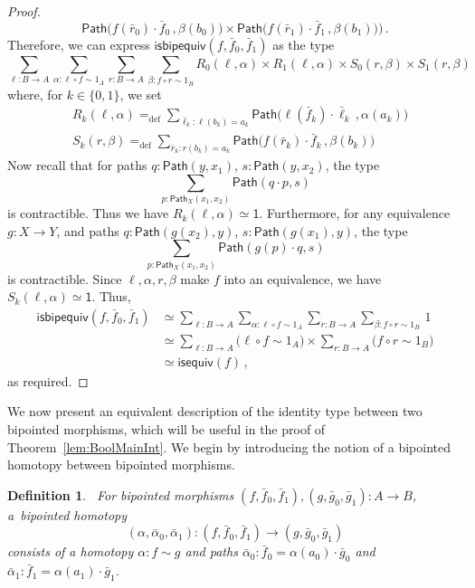 \documentclass[10pt,a4paper,oneside,reqno]{amsart}
\numberwithin{equation}{section}
\theoremstyle{mythm}
\theoremstyle{mydef}
\newtheorem{definition}[theorem]{Definition}
\theoremstyle{myrmk}
\newcommand{\defeq}{=_{\mathrm{def}}}
\newcommand{\co}{\colon}
\newcommand{\comp}{\circ}
\newcommand{\isequiv}{\mathsf{isequiv}}
\newcommand{\ct}{\cdot}
\newcommand{\Id}{\mathsf{Path}}
\newcommand{\one}{\mathsf{1}}
\newcommand{\isbipequiv}{\mathsf{isbipequiv}}
\begin{document}
\begin{proof}
\[\Id  \big( f (\bar{r}_0) \ct \bar{f}_0 \, ,  \beta(b_0) \big) 
\times 
\Id \big( f(\bar{r}_1) \ct \bar{f}_1 \, ,  \beta(b_1) \big)
\Big) \, .
\]
Therefore, we can express $\isbipequiv(f, \bar{f}_0, \bar{f}_1)$ as the type
\[
\sum_{\ell \co B \to  A} 
\sum_{\alpha : \ell \comp f \sim 1_A}
\sum_{ r \co B \to A} 
\sum_{\beta : f \comp r \sim 1_B} 
	R_0(\ell,\alpha) \times R_1(\ell,\alpha) \times S_0(r,\beta) \times S_1(r,\beta)
\]
where, for $k \in \{0,1\}$, we set
\begin{align*}
& R_k(\ell,\alpha) \defeq \sum_{\bar{\ell}_k : \ell(b_k)=a_k} \Id \big( \ell (\bar{f}_k) \ct \bar{\ell}_k \, ,  \alpha(a_k) \big) \\
& S_k(r,\beta) \defeq \sum_{\bar{r}_k : r(b_k)=a_k} \Id \big( f (\bar{r}_k) \ct \bar{f}_k \, ,  \beta(b_k) \big) 
\end{align*}
Now recall  that for paths $q : \Id(y,x_1)$, $s : \Id(y,x_2)$, the type 
\[
\sum_{p : \Id_X(x_1,x_2)} \Id(q \ct p,s)
\] 
is contractible. Thus we have $R_k(\ell,\alpha) \simeq \one$.
Furthermore, for any equivalence $g : X \to Y$, and paths $q : \Id(g(x_2),y)$, $s : \Id(g(x_1),y)$, the type 
\[
\sum_{p : \Id_X(x_1,x_2)} \Id(g(p) \ct q,s)
\] is contractible. Since $\ell, \alpha, r, \beta$ make $f$ into an equivalence, we have $S_k(\ell,\alpha) \simeq \one$. Thus,
\begin{align*} 
\isbipequiv(f,\bar{f}_0, \bar{f}_1) 
  & \simeq   \sum_{\ell \co B \to A} \sum_{\alpha : \ell \comp f \sim 1_A} \sum_{ r  \co B \to A} 
 \sum_{\beta \co f \comp r \sim 1_B} \, 1 \\
 & \simeq \sum_{\ell \co B \to A}  \big( \ell \comp f \sim 1_A \big) \times 
\sum_{r  \co B \to A} \big( f \comp r \sim 1_B \big) \\
 & \simeq \isequiv(f) \, ,
\end{align*} 
as required.
\end{proof}



We now present an equivalent description of the identity type between two bipointed morphisms, which 
will be useful in the proof of Theorem~\ref{lem:BoolMainInt}. We begin by introducing the notion of a bipointed homotopy between bipointed morphisms.





\begin{definition}\ \label{thm:biphomotopy} For bipointed morphisms $(f, \bar{f}_0, \bar{f}_1) , (g, \bar{g}_0, \bar{g}_1) \co A \to B$, a~\emph{bipointed homotopy} 
\[
(\alpha, \bar{\alpha}_0, \bar{\alpha}_1) \co (f, \bar{f}_0, \bar{f}_1) \to  (g, \bar{g}_0, \bar{g}_1)
\] 
consists of a homotopy $\alpha \co  f \sim g$ and paths
$\bar{\alpha}_0 \co  \bar{f}_0 = \alpha(a_0)  \cdot \bar{g}_0 $ and $\bar{\alpha}_1 \co \bar{f}_1 =  \alpha(a_1) \cdot \bar{g}_1$. 
\end{definition}
\end{document}

